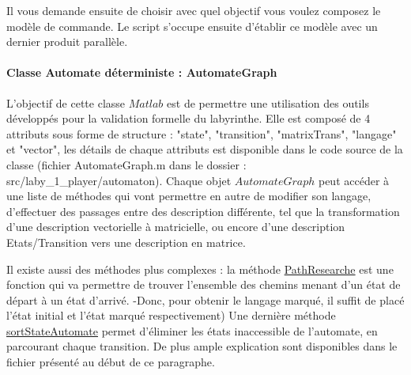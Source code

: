 Il vous demande ensuite de choisir avec quel objectif vous voulez composez le modèle de commande. Le script s'occupe ensuite d'établir ce modèle avec un dernier produit parallèle.  


\paragraph*{Classe Automate déterministe : AutomateGraph}\label{parag:AutomateGraph}
L'objectif de cette classe $Matlab$ est de permettre une utilisation des outils développés pour la validation formelle du labyrinthe. Elle est composé de 4 attributs sous forme de structure : "state", "transition", "matrixTrans", "langage" et "vector", les détails de chaque attributs est disponible dans le code source de la classe (fichier AutomateGraph.m dans le dossier : src/laby\_1\_player/automaton). Chaque objet $AutomateGraph$ peut accéder à une liste de méthodes qui vont permettre en autre de modifier son langage, d'effectuer des passages entre des description différente, tel que la transformation d'une description vectorielle à matricielle, ou encore d'une description Etats/Transition vers une description en matrice.


Il existe aussi des méthodes plus complexes : la méthode \underline{PathResearche} est une fonction qui va permettre de trouver l'ensemble des chemins menant d'un état de départ à un état d'arrivé. -Donc, pour obtenir le langage marqué, il suffit de placé l'état initial et l'état marqué respectivement) Une dernière méthode \underline{sortStateAutomate} permet d’éliminer les états inaccessible de l'automate, en parcourant chaque transition. De plus ample explication sont disponibles dans le fichier présenté au début de ce paragraphe.  


